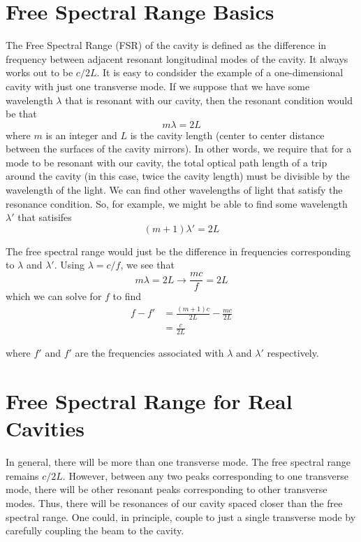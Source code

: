 \section{Free Spectral Range Basics}
The Free Spectral Range (FSR) of the cavity is defined as the difference in frequency between adjacent resonant longitudinal modes of the cavity. It always works out to be $c/2L$. 
It is easy to condsider the example of a one-dimensional cavity with just one transverse mode. If we suppose that we have some wavelength $\lambda$ that is resonant with our cavity, then the resonant condition would be that 
\begin{equation}
m\lambda=2L
\end{equation}
where $m$ is an integer and $L$ is the cavity length (center to center distance between the surfaces of the cavity mirrors). In other words, we require that for a mode to be resonant with our cavity, the total optical path length of a trip around the cavity (in this case, twice the cavity length) must be divisible by the wavelength of the light. We can find other wavelengths of light that satisfy the resonance condition. So, for example, we might be able to find some wavelength $\lambda'$ that satisifes
\begin{equation}
(m+1)\lambda'=2L
\end{equation}

The free spectral range would just be the difference in frequencies corresponding to $\lambda$ and $\lambda'$. Using $\lambda = c/f$, we see that 
\begin{equation}
m\lambda= 2L \rightarrow \frac{mc}{f}=2L
\end{equation}
which we can solve for $f$ to find 
\begin{align}
f-f'&= \frac{(m+1)c}{2L}-\frac{m c}{2L}\\
&= \frac{c}{2L}
\end{align}

where $f'$ and $f'$ are the frequencies associated with $\lambda$ and $\lambda'$ respectively. 

\section{Free Spectral Range for Real Cavities}
In general, there will be more than one transverse mode. The free spectral range remains $c/2L$. However, between any two peaks corresponding to one transverse mode, there will be other resonant peaks corresponding to other transverse modes. Thus, there will be resonances of our cavity spaced closer than the free spectral range. One could, in principle, couple to just a single transverse mode by carefully coupling the beam to the cavity.

